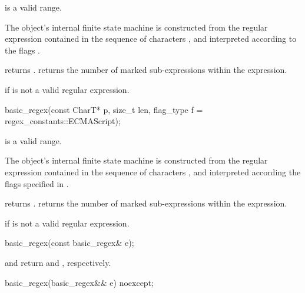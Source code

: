 \begin{itemdescr}
\pnum
\expects
{} is a valid range.

\pnum
\effects
The object's internal finite state machine
is constructed from the regular expression contained in
the sequence of characters
, and
interpreted according to the flags .

\pnum
\ensures
{} returns .
 returns the number of marked sub-expressions
within the expression.

\pnum
\throws
{} if
 is not a valid regular expression.
\end{itemdescr}

%
\begin{itemdecl}
basic_regex(const CharT* p, size_t len, flag_type f = regex_constants::ECMAScript);
\end{itemdecl}

\begin{itemdescr}
\pnum
\expects
{} is a valid range.

\pnum
\effects
The object's internal finite state machine
is constructed from the regular expression contained in
the sequence of characters , and
interpreted according the flags specified in .

\pnum
\ensures
{} returns .
 returns the number of marked sub-expressions
within the expression.

\pnum
\throws
{} if  is not a valid regular expression.
\end{itemdescr}

%
\begin{itemdecl}
basic_regex(const basic_regex& e);
\end{itemdecl}

\begin{itemdescr}
\pnum
\ensures
{} and  return
 and , respectively.
\end{itemdescr}

%
\begin{itemdecl}
basic_regex(basic_regex&& e) noexcept;
\end{itemdecl}

